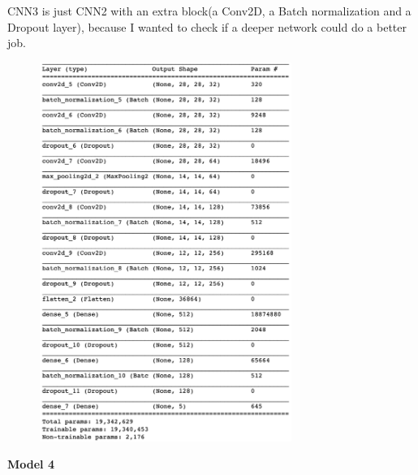 \documentclass[12pt]{article}
\begin{document}
CNN3 is just CNN2 with an extra block(a Conv2D, a Batch normalization and a Dropout layer), because I wanted to check if a deeper network could do a better job.
\begin{figure}[H]
\begin{center}
    \includegraphics[width=0.73\textwidth]{../plots/3.png}
\end{center}
\end{figure}
\vspace*{-1.0cm}

\textbf{Model 4}
\end{document}
